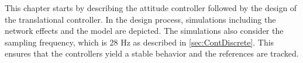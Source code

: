 
This chapter starts by describing the attitude controller followed by the design of the translational controller. In the design process, simulations including the network effects and the model are depicted. The simulations also consider the sampling frequency, which is 28 Hz as described in \autoref{sec:ContDiscrete}. This ensures that the controllers yield a stable behavior and the references are tracked. 